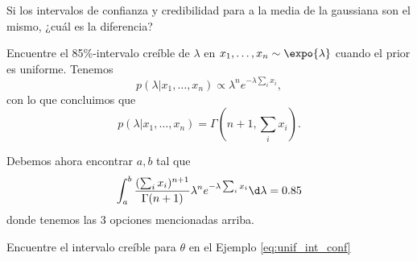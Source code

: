 \begin{remark}
    Si los intervalos de confianza y credibilidad para a la media de la gaussiana son el mismo, ¿cuál es la diferencia? 
\end{remark}

\begin{example} Encuentre el 85\%-intervalo creíble de $\lambda$ en $x_1,\ldots, x_n\sim \expo{\lambda}$ cuando el prior es uniforme. Tenemos 
\begin{equation}
    p(\lambda|x_1,\ldots, x_n) \propto \lambda^ne^{-\lambda\sum_i x_i},
\end{equation}
con lo que concluimos que
\begin{equation}
p(\lambda|x_1,\ldots, x_n) = \Gamma(n+1,\sum_i x_i).
\end{equation}

Debemos ahora encontrar $a,b$ tal que 
\begin{equation}
    \int_a^b \frac{(\sum_i x_i)^{n+1}}{\Gamma(n+1)}\lambda^ne^{-\lambda\sum_i x_i}\d\lambda = 0.85
\end{equation}
donde tenemos las 3 opciones mencionadas arriba.
\end{example}

\begin{exercise} Encuentre el intervalo creíble para $\theta$ en el Ejemplo \ref{eq:unif_int_conf}
\end{exercise}




